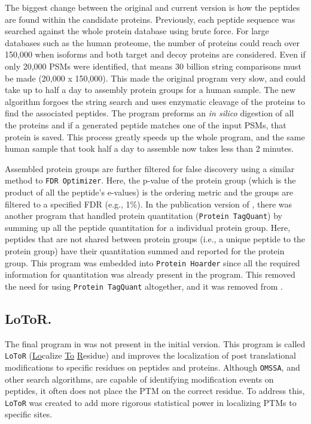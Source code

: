 The biggest change between the original and current version is how the peptides are found within the candidate proteins. Previously, each peptide sequence was searched against the whole protein database using brute force. For large databases such as the human proteome, the number of proteins could reach over 150,000 when isoforms and both target and decoy proteins are considered. Even if only 20,000 PSMs were identified, that means 30 billion string comparisons must be made (20,000 x 150,000). This made the original program very slow, and could take up to half a day to assembly protein groups for a human sample. The new algorithm forgoes the string search and uses enzymatic cleavage of the proteins to find the associated peptides. The program preforms an \emph{in silico} digestion of all the proteins and if a generated peptide matches one of the input PSMs, that protein is saved. This process greatly speeds up the whole program, and the same human sample that took half a day to assemble now takes less than 2 minutes. 

Assembled protein groups are further filtered for false discovery using a similar method to \texttt{FDR Optimizer}. Here, the p-value of the protein group (which is the product of all the peptide's e-values) is the ordering metric and the groups are filtered to a specified FDR (e.g., 1\%). In the publication version of \compass{}, there was another program that handled protein quantitation (\texttt{Protein TagQuant}) by summing up all the peptide quantitation for a individual protein group. Here, peptides that are not shared between protein groups (i.e., a unique peptide to the protein group) have their quantitation summed and reported for the protein group. This program was embedded into \texttt{Protein Hoarder} since all the required information for quantitation was already present in the program. This removed the need for using \texttt{Protein TagQuant} altogether, and it was removed from \compass{}. 

\subsection*{LoToR.}
The final program in \compass{} was not present in the initial version. This program is called \texttt{LoToR} (\underline{Lo}calize \underline{To} \underline{R}esidue) and improves the localization of post translational modifications to specific residues on peptides and proteins. Although \texttt{OMSSA}, and other search algorithms, are capable of identifying modification events on peptides, it often does not place the PTM on the correct residue. To address this, \texttt{LoToR} was created to add more rigorous statistical power in localizing PTMs to specific sites. 

